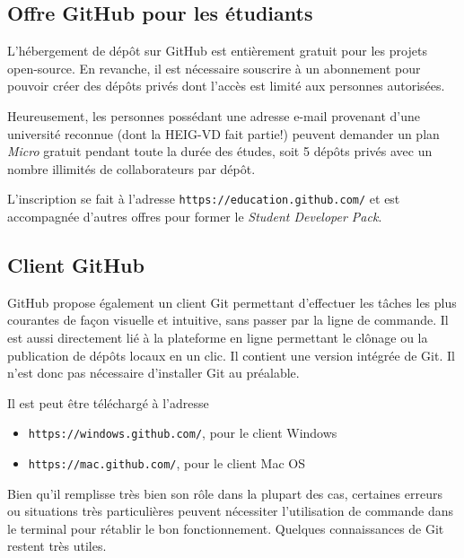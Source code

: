 \documentclass[11pt,a4paper]{article}
\begin{document}
\subsection{Offre GitHub pour les étudiants}

L'hébergement de dépôt sur GitHub est entièrement gratuit pour les projets open-source.
En revanche, il est nécessaire souscrire à un abonnement pour pouvoir créer des dépôts privés dont l'accès est limité aux personnes autorisées.

Heureusement, les personnes possédant une adresse e-mail provenant d'une université reconnue (dont la HEIG-VD fait partie!) peuvent demander un plan \textit{Micro} gratuit pendant toute la durée des études, soit 5 dépôts privés avec un nombre illimités de collaborateurs par dépôt.

L'inscription se fait à l'adresse {\tt https://education.github.com/} et est accompagnée d'autres offres pour former le {\it Student Developer Pack}.

\subsection{Client GitHub}

GitHub propose également un client Git permettant d'effectuer les tâches les plus courantes de façon visuelle et intuitive, sans passer par la ligne de commande.
Il est aussi directement lié à la plateforme en ligne permettant le clônage ou la publication de dépôts locaux en un clic.
Il contient une version intégrée de Git. Il n'est donc pas nécessaire d'installer Git au préalable.

Il est peut être téléchargé à l'adresse

\begin{itemize}
	\item {\tt https://windows.github.com/}, pour le client Windows
	\item {\tt https://mac.github.com/}, pour le client Mac OS
\end{itemize}

Bien qu'il remplisse très bien son rôle dans la plupart des cas, certaines erreurs ou situations très particulières peuvent nécessiter l'utilisation de commande dans le terminal pour rétablir le bon fonctionnement.
Quelques connaissances de Git restent très utiles.
\end{document}
